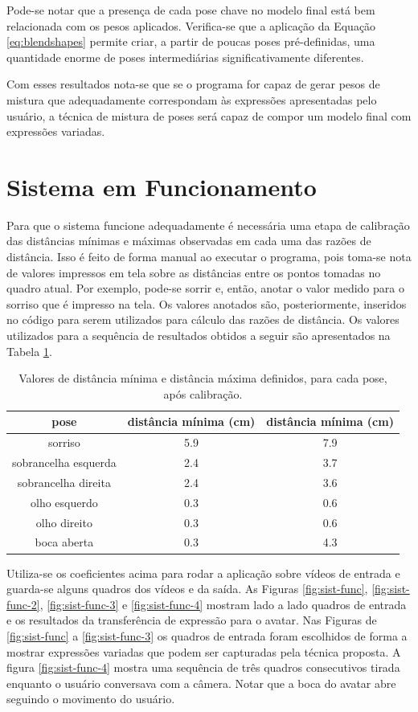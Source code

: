 Pode-se notar que a presença de cada pose chave no modelo final está bem
relacionada com os pesos aplicados. Verifica-se que a aplicação da Equação
\ref{eq:blendshapes} permite criar, a partir de poucas poses pré-definidas, uma
quantidade enorme de poses intermediárias significativamente diferentes.

Com esses resultados nota-se que se o programa for capaz de gerar pesos de
mistura que adequadamente correspondam às expressões apresentadas pelo usuário,
a técnica de mistura de poses será capaz de compor um modelo final com
expressões variadas.

\section{Sistema em Funcionamento}

Para que o sistema funcione adequadamente é necessária uma etapa de calibração
das distâncias mínimas e máximas observadas em cada uma das razões de distância.
Isso é feito de forma manual ao executar o programa, pois toma-se nota de
valores impressos em tela sobre as distâncias entre os pontos tomadas no quadro
atual. Por exemplo, pode-se sorrir e, então, anotar o valor medido para o
sorriso que é impresso na tela. Os valores anotados são, posteriormente,
inseridos no código para serem utilizados para cálculo das razões de distância.
Os valores utilizados para a sequência de resultados obtidos a seguir são
apresentados na Tabela \ref{tab:distance-ratio-coeffs}.

\begin{table}
\centering
\begin{tabular}{|c|c|c|}
\hline
pose & distância mínima (cm) & distância mínima (cm) \\ \hline
sorriso & 5.9 & 7.9 \\ \hline
sobrancelha esquerda & 2.4 & 3.7 \\ \hline
sobrancelha direita & 2.4 & 3.6 \\ \hline
olho esquerdo & 0.3 & 0.6 \\ \hline
olho direito & 0.3 & 0.6 \\ \hline
boca aberta & 0.3 & 4.3 \\ \hline
\end{tabular}
\caption{Valores de distância mínima e distância máxima definidos, para cada pose, após calibração.}
\label{tab:distance-ratio-coeffs}
\end{table}

Utiliza-se os coeficientes acima para rodar a aplicação sobre vídeos de entrada
e guarda-se alguns quadros dos vídeos e da saída.  As Figuras
\ref{fig:sist-func}, \ref{fig:sist-func-2}, \ref{fig:sist-func-3} e
\ref{fig:sist-func-4} mostram lado a lado quadros de entrada e os resultados da
transferência de expressão para o avatar. Nas Figuras de \ref{fig:sist-func} a
\ref{fig:sist-func-3} os quadros de entrada foram escolhidos de forma a mostrar
expressões variadas que podem ser capturadas pela técnica proposta. A figura
\ref{fig:sist-func-4} mostra uma sequência de três quadros consecutivos tirada
enquanto o usuário conversava com a câmera. Notar que a boca do avatar abre
seguindo o movimento do usuário.

